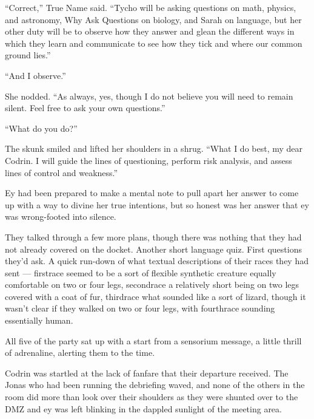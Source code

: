 ``Correct,'' True Name said. ``Tycho will be asking questions on math, physics, and astronomy, Why Ask Questions on biology, and Sarah on language, but her other duty will be to observe how they answer and glean the different ways in which they learn and communicate to see how they tick and where our common ground lies.''

``And I observe.''

She nodded. ``As always, yes, though I do not believe you will need to remain silent. Feel free to ask your own questions.''

``What do you do?''

The skunk smiled and lifted her shoulders in a shrug. ``What I do best, my dear Codrin. I will guide the lines of questioning, perform risk analysis, and assess lines of control and weakness.''

Ey had been prepared to make a mental note to pull apart her answer to come up with a way to divine her true intentions, but so honest was her answer that ey was wrong-footed into silence.

They talked through a few more plans, though there was nothing that they had not already covered on the docket. Another short language quiz. First questions they'd ask. A quick run-down of what textual descriptions of their races they had sent — firstrace seemed to be a sort of flexible synthetic creature equally comfortable on two or four legs, secondrace a relatively short being on two legs covered with a coat of fur, thirdrace what sounded like a sort of lizard, though it wasn't clear if they walked on two or four legs, with fourthrace sounding essentially human.

All five of the party sat up with a start from a sensorium message, a little thrill of adrenaline, alerting them to the time.

Codrin was startled at the lack of fanfare that their departure received. The Jonas who had been running the debriefing waved, and none of the others in the room did more than look over their shoulders as they were shunted over to the DMZ and ey was left blinking in the dappled sunlight of the meeting area.

